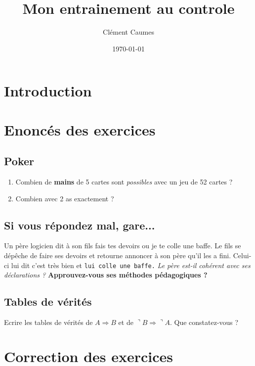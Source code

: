 \documentclass[a4]{article}
\author{Clément Caumes}
\title{Mon entrainement au controle}
\date{\today}
\begin{document}
\maketitle
\section{Introduction}
\section{Enoncés des exercices}
\subsection{Poker}
\begin{enumerate}
\item Combien de \textbf{mains} de 5 cartes sont \textit{possibles} avec {\tiny un jeu} de 52 cartes ?
\item Combien avec 2 as {\huge exactement} ? 
\end{enumerate}
\subsection{Si vous répondez mal, gare...}
Un père {\huge logicien} dit à son fils \textsf{fais tes devoirs ou je te colle une baffe.}
Le fils se dépêche de faire ses devoirs et retourne annoncer à son père qu'il les a fini.
Celui-ci lui dit c'est très bien et \texttt{lui colle une baffe.} \textit{Le père est-il cohérent avec ses déclarations ?}
\textbf{Approuvez-vous ses méthodes pédagogiques ?}
\subsection{Tables de vérités}
Ecrire les tables de vérités de $A \Rightarrow B$ et de $\urcorner B \Rightarrow \urcorner A$. Que constatez-vous ?
\section{Correction des exercices}
\end{document}
